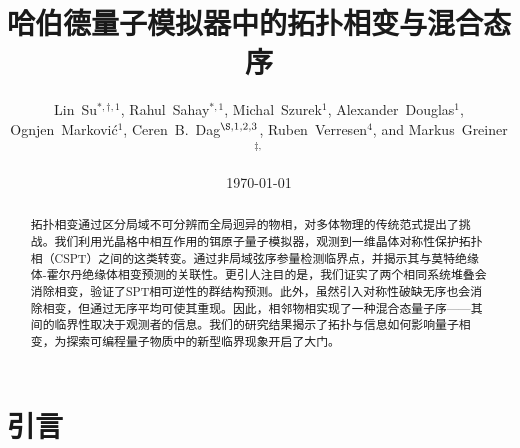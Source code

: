 \documentclass[preprint,superscriptaddress,floatfix,nofootinbib]{revtex4-2}
\begin{document}
\title{哈伯德量子模拟器中的拓扑相变与混合态序}
\author{
Lin~Su$^{*,\dagger,1}$,
Rahul~Sahay$^{*,1}$,
Michal~Szurek$^{1}$,
Alexander~Douglas$^{1}$,
Ognjen~Markovi\'{c}$^{1}$,
Ceren~B.~Dag$^{\S, 1,2,3}$,
Ruben~Verresen$^{4}$,
and Markus~Greiner$^{\ddagger,}$
}


\date{\today}
\begin{abstract}
拓扑相变通过区分局域不可分辨而全局迥异的物相，对多体物理的传统范式提出了挑战。我们利用光晶格中相互作用的铒原子量子模拟器，观测到一维晶体对称性保护拓扑相（CSPT）之间的这类转变。通过非局域弦序参量检测临界点，并揭示其与莫特绝缘体-霍尔丹绝缘体相变预测的关联性。更引人注目的是，我们证实了两个相同系统堆叠会消除相变，验证了SPT相可逆性的群结构预测。此外，虽然引入对称性破缺无序也会消除相变，但通过无序平均可使其重现。因此，相邻物相实现了一种混合态量子序——其间的临界性取决于观测者的信息。我们的研究结果揭示了拓扑与信息如何影响量子相变，为探索可编程量子物质中的新型临界现象开启了大门。
\end{abstract}

\maketitle
\section{引言}
\end{document}
